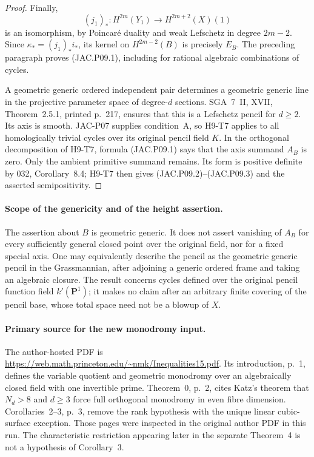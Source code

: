 \documentclass[11pt,a4paper]{article}
\begin{document}
\begin{proof}
Finally,
\[
 (j_1)_*:H^{2m}(Y_1)\longrightarrow H^{2m+2}(X)(1)
\]
is an isomorphism, by Poincar\'e duality and weak Lefschetz in degree
$2m-2$. Since $\kappa_*=(j_1)_*i_*$, its kernel on
$H^{2m-2}(B)$ is precisely $E_B$. The preceding paragraph proves
(JAC.P09.1), including for rational algebraic combinations of cycles.

A geometric generic ordered independent pair determines a geometric
generic line in the projective parameter space of degree-$d$
sections. SGA~7~II, XVII, Theorem~2.5.1, printed p.~217, ensures
that this is a Lefschetz pencil for $d\ge2$. Its axis is smooth.
JAC-P07 supplies condition~A, so H9-T7 applies to all homologically
trivial cycles over its original pencil field $K$. In the
orthogonal decomposition of H9-T7, formula (JAC.P09.1) says that
the axis summand $A_B$ is zero. Only the ambient primitive summand
remains. Its form is positive definite by 032, Corollary~8.4;
H9-T7 then gives (JAC.P09.2)--(JAC.P09.3) and the asserted
semipositivity.
\end{proof}

\paragraph{Scope of the genericity and of the height assertion.}
The assertion about $B$ is geometric generic. It does not assert
vanishing of $A_B$ for every sufficiently general closed point over
the original field, nor for a fixed special axis. One may equivalently
describe the pencil as the geometric generic pencil in the
Grassmannian, after adjoining a generic ordered frame and taking an
algebraic closure. The result concerns cycles defined over the
original pencil function field $k'(\mathbf P^1)$; it makes no claim
after an arbitrary finite covering of the pencil base, whose total
space need not be a blowup of $X$.

\paragraph{Primary source for the new monodromy input.}
The author-hosted PDF is
\url{https://web.math.princeton.edu/~nmk/Inequalities15.pdf}.
Its introduction, p.~1, defines the variable quotient and geometric
monodromy over an algebraically closed field with one invertible
prime. Theorem~0, p.~2, cites Katz's theorem that $N_d>8$ and
$d\ge3$ force full orthogonal monodromy in even fibre dimension.
Corollaries~2--3, p.~3, remove the rank hypothesis with the unique
linear cubic-surface exception. Those pages were inspected in the
original author PDF in this run. The characteristic restriction
appearing later in the separate Theorem~4 is not a hypothesis of
Corollary~3.
\end{document}
